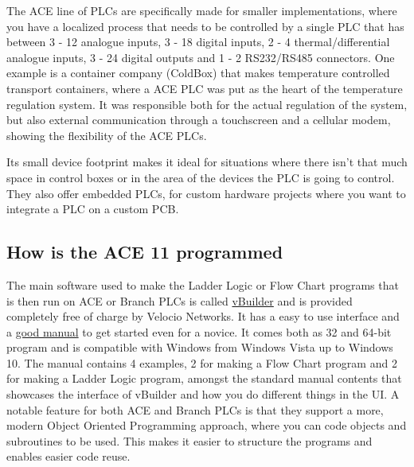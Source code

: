 \documentclass[11pt]{article}
\begin{document}
The ACE line of PLCs are specifically made for smaller implementations, where you have a localized process that needs to be controlled by a single PLC that has between 3 - 12 analogue inputs, 3 - 18 digital inputs, 2 - 4 thermal/differential analogue inputs, 3 - 24 digital outputs and 1 - 2 RS232/RS485 connectors. One example is a container company (ColdBox) that makes temperature controlled transport containers, where a ACE PLC was put as the heart of the temperature regulation system. It was responsible both for the actual regulation of the system, but also external communication through a touchscreen and a cellular modem, showing the flexibility of the ACE PLCs.

Its small device footprint makes it ideal for situations where there isn't that much space in control boxes or in the area of the devices the PLC is going to control. They also offer embedded PLCs, for custom hardware projects where you want to integrate a PLC on a custom PCB.

\subsection{How is the ACE 11 programmed}
\label{sec:orge4df9f2}
The main software used to make the Ladder Logic or Flow Chart programs that is then run on ACE or Branch PLCs is called \href{http://velocio.net/vbuilder}{vBuilder} and is provided completely free of charge by Velocio Networks. It has a easy to use interface and a \href{http://velocio.net/wp-content/uploads/2016/01/vBuilder-Manual.pdf}{good manual} to get started even for a novice. It comes both as 32 and 64-bit program and is compatible with Windows from Windows Vista up to Windows 10. The manual contains 4 examples, 2 for making a Flow Chart program and 2 for making a Ladder Logic program, amongst the standard manual contents that showcases the interface of vBuilder and how you do different things in the UI. A notable feature for both ACE and Branch PLCs is that they support a more, modern Object Oriented Programming approach, where you can code objects and subroutines to be used. This makes it easier to structure the programs and enables easier code reuse.
\end{document}
